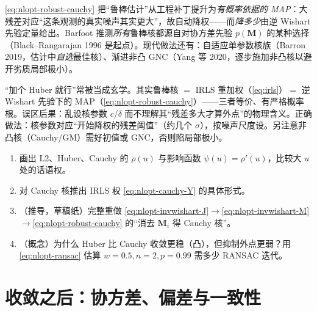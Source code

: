 \begin{insight}[鲁棒核 $=$ 某协方差先验下的 MAP]
\cref{eq:nlopt-robust-cauchy} 把“鲁棒估计”从工程补丁提升为\emph{有概率依据的 MAP}：大残差对应“这条观测的真实噪声其实更大”，故自动降权——而\emph{降多少}由逆 Wishart 先验定量给出。Barfoot\cite{barfoot2024state} 推测\emph{所有}鲁棒核都源自对协方差先验 $p(\mathbf{M})$ 的某种选择（Black--Rangarajan 1996 是起点）。现代做法还有：自适应单参数核族（Barron 2019，估计中\emph{自选}最佳核）、渐进非凸 GNC（Yang 等 2020，逐步施加非凸核以避开劣质局部极小）。
\end{insight}

\begin{pitfall}
“加个 Huber 就行”常被当成玄学。其实鲁棒核 $=$ IRLS 重加权（\cref{eq:irls}）$=$ 逆 Wishart 先验下的 MAP（\cref{eq:nlopt-robust-cauchy}）——三者等价、有严格概率根。误区后果：乱设核参数 $c$/$\delta$ 而不理解其“残差多大才算外点”的物理含义。正确做法：核参数对应“开始降权的残差阈值”（约几个 $\sigma$），按噪声尺度设。另注意非凸核（Cauchy/GM）需好初值或 GNC，否则陷局部极小。
\end{pitfall}

\begin{practice}
\begin{enumerate}
  \item 画出 L2、Huber、Cauchy 的 $\rho(u)$ 与影响函数 $\psi(u)=\rho'(u)$，比较大 $u$ 处的话语权。
  \item 对 Cauchy 核推出 IRLS 权 \cref{eq:nlopt-cauchy-Y} 的具体形式。
  \item （推导，草稿纸）完整重做 \cref{eq:nlopt-invwishart-J}$\to$\cref{eq:nlopt-invwishart-M}$\to$\cref{eq:nlopt-robust-cauchy} 的“消去 $\mathbf{M}_i$ 得 Cauchy 核”。
  \item （概念）为什么 Huber 比 Cauchy 收敛更稳（凸），但抑制外点更弱？用 \cref{eq:nlopt-ransac} 估算 $w=0.5,n=2,p=0.99$ 需多少 RANSAC 迭代。
\end{enumerate}
\end{practice}

\section{收敛之后：协方差、偏差与一致性}
\label{sec:nlopt-cov}

